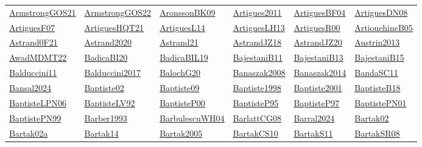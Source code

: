 \begin{longtable}{*{6}{l}}
\hyperref[detail:ArmstrongGOS21]{ArmstrongGOS21} & \hyperref[detail:ArmstrongGOS22]{ArmstrongGOS22} & \hyperref[detail:AronssonBK09]{AronssonBK09} & \hyperref[detail:Artigues2011]{Artigues2011} & \hyperref[detail:ArtiguesBF04]{ArtiguesBF04} & \hyperref[detail:ArtiguesDN08]{ArtiguesDN08}\\ 
\hyperref[detail:ArtiguesF07]{ArtiguesF07} & \hyperref[detail:ArtiguesHQT21]{ArtiguesHQT21} & \hyperref[detail:ArtiguesL14]{ArtiguesL14} & \hyperref[detail:ArtiguesLH13]{ArtiguesLH13} & \hyperref[detail:ArtiguesR00]{ArtiguesR00} & \hyperref[detail:ArtiouchineB05]{ArtiouchineB05}\\ 
\hyperref[detail:Astrand0F21]{Astrand0F21} & \hyperref[detail:Astrand2020]{Astrand2020} & \hyperref[detail:Astrand21]{Astrand21} & \hyperref[detail:AstrandJZ18]{AstrandJZ18} & \hyperref[detail:AstrandJZ20]{AstrandJZ20} & \hyperref[detail:Austrin2013]{Austrin2013}\\ 
\hyperref[detail:AwadMDMT22]{AwadMDMT22} & \hyperref[detail:BadicaBI20]{BadicaBI20} & \hyperref[detail:BadicaBIL19]{BadicaBIL19} & \hyperref[detail:BajestaniB11]{BajestaniB11} & \hyperref[detail:BajestaniB13]{BajestaniB13} & \hyperref[detail:BajestaniB15]{BajestaniB15}\\ 
\hyperref[detail:Balduccini11]{Balduccini11} & \hyperref[detail:Balduccini2017]{Balduccini2017} & \hyperref[detail:BalochG20]{BalochG20} & \hyperref[detail:Banaszak2008]{Banaszak2008} & \hyperref[detail:Banaszak2014]{Banaszak2014} & \hyperref[detail:BandaSC11]{BandaSC11}\\ 
\hyperref[detail:Bansal2024]{Bansal2024} & \hyperref[detail:Baptiste02]{Baptiste02} & \hyperref[detail:Baptiste09]{Baptiste09} & \hyperref[detail:Baptiste1998]{Baptiste1998} & \hyperref[detail:Baptiste2001]{Baptiste2001} & \hyperref[detail:BaptisteB18]{BaptisteB18}\\ 
\hyperref[detail:BaptisteLPN06]{BaptisteLPN06} & \hyperref[detail:BaptisteLV92]{BaptisteLV92} & \hyperref[detail:BaptisteP00]{BaptisteP00} & \hyperref[detail:BaptisteP95]{BaptisteP95} & \hyperref[detail:BaptisteP97]{BaptisteP97} & \hyperref[detail:BaptistePN01]{BaptistePN01}\\ 
\hyperref[detail:BaptistePN99]{BaptistePN99} & \hyperref[detail:Barber1993]{Barber1993} & \hyperref[detail:BarbulescuWH04]{BarbulescuWH04} & \hyperref[detail:BarlattCG08]{BarlattCG08} & \hyperref[detail:Barral2024]{Barral2024} & \hyperref[detail:Bartak02]{Bartak02}\\ 
\hyperref[detail:Bartak02a]{Bartak02a} & \hyperref[detail:Bartak14]{Bartak14} & \hyperref[detail:Bartak2005]{Bartak2005} & \hyperref[detail:BartakCS10]{BartakCS10} & \hyperref[detail:BartakS11]{BartakS11} & \hyperref[detail:BartakSR08]{BartakSR08}\\ 

\end{longtable}
